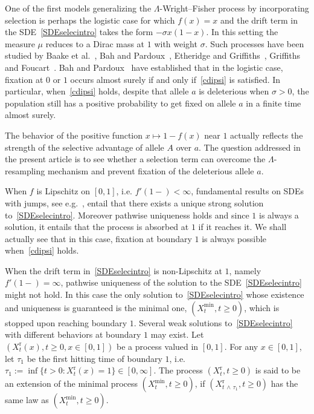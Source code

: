 \documentclass[AHL,Unicode,longabstracts,published]{cedram}
\newcommand{\rmr}{\mathrm{r}}
\begin{document}
One of the first models generalizing the $\Lambda$-Wright--Fisher process by incorporating selection is perhaps the logistic case for which $f(x)=x$ and the drift term in the SDE~\eqref{SDEselecintro} takes the form $-\sigma x(1-x)$. In this setting the measure $\mu$ reduces to a Dirac mass at $1$ with weight $\sigma$. Such processes have been studied by Baake et al.~\cite{baake2016}, Bah and Pardoux~\cite{zbMATH06403252}, Etheridge and Griffiths~\cite{zbMATH05832932}, Griffiths~\cite{zbMATH06387922} and Foucart~\cite{zbMATH06346921}. Bah and Pardoux~\cite[Theorem~4.3]{zbMATH06403252} have established that in the logistic case, fixation at $0$ or $1$ occurs almost surely if and only if~\eqref{cdipsi} is satisfied. In particular, when~\eqref{cdipsi} holds, despite that allele $a$ is deleterious when $\sigma>0$, the population still has a positive probability to get fixed on allele $a$ in a finite time almost surely.

The behavior of the positive function $x\mapsto 1-f(x)$ near $1$ actually reflects the strength of the selective advantage of allele $A$ over $a$. The question addressed in the present article is to see whether a selection term can overcome the $\Lambda$-resampling mechanism and prevent fixation of the deleterious allele $a$.

When $f$ is Lipschitz on $[0,1]$, i.e. $f'(1-)<\infty$, fundamental results on SDEs with jumps, see e.g.~\cite{DawsonLi}, entail that there exists a unique strong solution to~\eqref{SDEselecintro}. Moreover pathwise uniqueness holds and since $1$ is always a solution, it entails that the process is absorbed at $1$ if it reaches it. We shall actually see that in this case, fixation at boundary $1$ is always possible when~\eqref{cdipsi} holds.

When the drift term in~\eqref{SDEselecintro} is non-Lipschitz at $1$, namely $f'(1-)=\infty$, pathwise uniqueness of the solution to the SDE~\eqref{SDEselecintro} might not hold. In this case the only solution to~\eqref{SDEselecintro} whose existence and uniqueness is guaranteed is the minimal one, $(X_t^{\min},t\geq 0)$, which is stopped upon reaching boundary $1$. Several weak solutions to~\eqref{SDEselecintro} with different behaviors at boundary $1$ may exist. Let $(X^{\rmr}_t(x),t\geq 0,x\in [0,1])$ be a process valued in $[0,1]$. For any $x\in [0,1]$, let $\tau_1$ be the first hitting time of boundary $1$, i.e. $\tau_1:=\inf\{t>0: X^{\rmr}_t(x)=1\}\in [0,\infty]$. The process $(X^{\rmr}_t,t\geq 0)$ is said to be an extension of the minimal process $(X^{\min}_t,t\geq 0)$, if $(X^{\rmr}_{t\,\wedge\,\tau_1},t\geq 0)$ has the same law as $(X^{\min}_t,t\geq 0)$.
\end{document}
